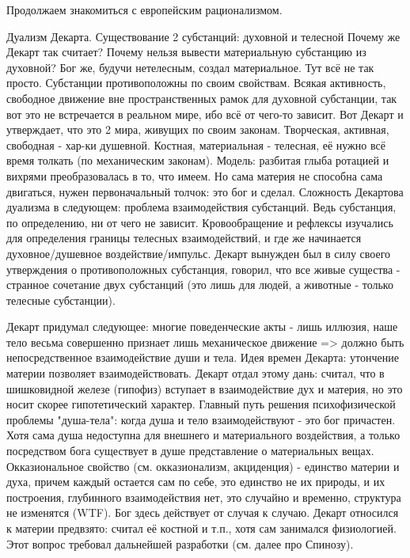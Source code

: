 Продолжаем знакомиться с европейским рационализмом.

Дуализм Декарта. Существование 2 субстанций: духовной и телесной
Почему же Декарт так считает? Почему нельзя вывести материальную субстанцию из духовной? Бог же, будучи нетелесным, создал материальное. Тут всё не так просто. Субстанции противоположны по своим свойствам. Всякая активность, свободное движение вне пространственных рамок для духовной субстанции, так вот это не встречается в реальном мире, ибо всё от чего-то зависит. Вот Декарт и утверждает, что это 2 мира, живущих по своим законам. Творческая, активная, свободная - хар-ки душевной. Костная, материальная - телесная, её нужно всё время толкать (по механическим законам). Модель: разбитая глыба ротацией и вихрями преобразовалась в то, что имеем. Но сама материя не способна сама двигаться, нужен первоначальный толчок: это бог и сделал. 
Сложность Декартова дуализма в следующем: проблема взаимодействия субстанций. Ведь субстанция, по определению, ни от чего не зависит. Кровообращение и рефлексы изучались для определения границы телесных взаимодействий, и где же начинается духовное/душевное воздействие/импульс. Декарт вынужден был в силу своего утверждения о противоположных субстанция, говорил, что все живые существа - странное сочетание двух субстанций (это лишь для людей, а животные - только телесные субстанции). 

Декарт придумал следующее:
многие поведенческие акты - лишь иллюзия, наше тело весьма совершенно
признает лишь механическое движение => должно быть непосредственное взаимодействие души и тела. Идея времен Декарта: утончение материи позволяет взаимодействовать. Декарт отдал этому дань: считал, что в шишковидной железе (гипофиз) вступает в взаимодействие дух и материя, но это носит скорее гипотетический характер. Главный путь решения психофизической проблемы "душа-тела": когда душа и тело взаимодействуют - это бог причастен. Хотя сама душа недоступна для внешнего и материального воздействия, а только посредством бога существует в душе представление о материальных вещах. Окказиональное свойство (см. окказионализм, акциденция) - единство материи и духа, причем каждый остается сам по себе, это единство не их природы, и их построения, глубинного взаимодействия нет, это случайно и временно, структура не изменятся (WTF). Бог здесь действует от случая к случаю. Декарт относился к материи предвзято: считал её костной и т.п., хотя сам занимался физиологией. Этот вопрос требовал дальнейшей разработки (см. далее про Спинозу).

